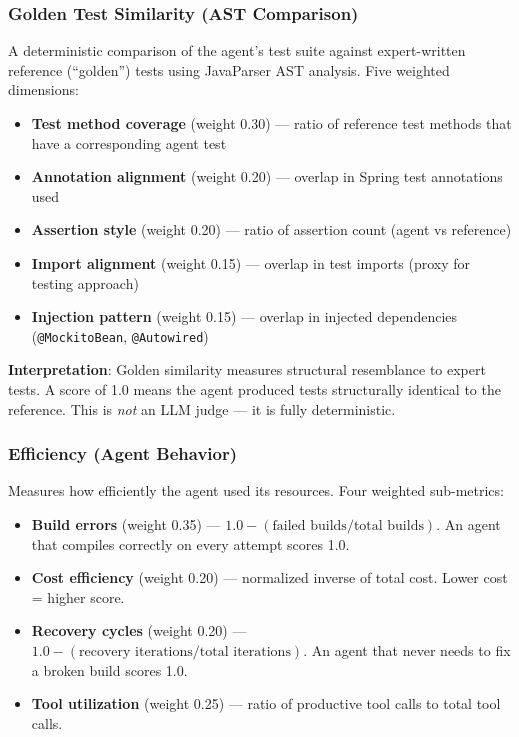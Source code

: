 \documentclass[11pt,a4paper]{article}
\begin{document}
\subsubsection{Golden Test Similarity (AST Comparison)}

A deterministic comparison of the agent's test suite against expert-written
reference (``golden'') tests using JavaParser AST analysis. Five weighted
dimensions:

\begin{itemize}
  \item \textbf{Test method coverage} (weight 0.30) --- ratio of reference test methods that have a corresponding agent test
  \item \textbf{Annotation alignment} (weight 0.20) --- overlap in Spring test annotations used
  \item \textbf{Assertion style} (weight 0.20) --- ratio of assertion count (agent vs reference)
  \item \textbf{Import alignment} (weight 0.15) --- overlap in test imports (proxy for testing approach)
  \item \textbf{Injection pattern} (weight 0.15) --- overlap in injected dependencies (\texttt{@MockitoBean}, \texttt{@Autowired})
\end{itemize}

\textbf{Interpretation}: Golden similarity measures structural resemblance to
expert tests. A score of 1.0 means the agent produced tests structurally identical
to the reference. This is \emph{not} an LLM judge --- it is fully deterministic.

\subsubsection{Efficiency (Agent Behavior)}

Measures how efficiently the agent used its resources. Four weighted sub-metrics:

\begin{itemize}
  \item \textbf{Build errors} (weight 0.35) --- $1.0 - (\text{failed builds} / \text{total builds})$. An agent that compiles correctly on every attempt scores 1.0.
  \item \textbf{Cost efficiency} (weight 0.20) --- normalized inverse of total cost. Lower cost = higher score.
  \item \textbf{Recovery cycles} (weight 0.20) --- $1.0 - (\text{recovery iterations} / \text{total iterations})$. An agent that never needs to fix a broken build scores 1.0.
  \item \textbf{Tool utilization} (weight 0.25) --- ratio of productive tool calls to total tool calls.
\end{itemize}
\end{document}
